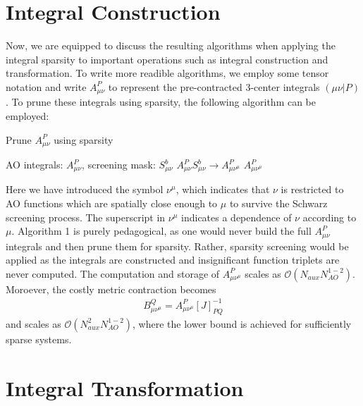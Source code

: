 \section{Integral Construction}

Now, we are equipped to discuss the resulting algorithms when applying the integral sparsity to important operations such as
integral construction and transformation. To write more readible algorithms, 
we employ some tensor notation and write $A_{\mu \nu}^P$ to represent
the pre-contracted 3-center integrals $(\mu \nu |P)$. To prune these integrals using sparsity, 
the following algorithm can be employed:

\begin{algorithm}
\caption{Prune $A_{\mu \nu}^P$ using sparsity}
\begin{algorithmic}
\REQUIRE AO integrals: $A_{\mu \nu}^P$, screening mask: $S_{\mu \nu}^b$
    \STATE $A_{\mu \nu}^P S_{\mu \nu}^b \rightarrow A_{\mu \nu^{\mu}}^P$
\ENDFOR
\RETURN $A_{\mu \nu^\mu}^P$
\end{algorithmic}
\end{algorithm}

\noindent Here we have introduced the symbol $\nu^\mu$, which indicates that $\nu$ is restricted to AO functions
which are spatially close enough to $\mu$ to survive the Schwarz screening process. The superscript in $\nu^\mu$ 
indicates a dependence of $\nu$ according to $\mu$. Algorithm 1 is purely pedagogical, as one would never
build the full $A_{\mu \nu}^P$ integrals and then prune them for sparsity. 
Rather, sparsity screening would be applied as the integrals are constructed and insignificant
function triplets are never computed. The computation
and storage of $A_{\mu \nu^\mu}^P$ scales as $\mathcal{O}(N_{aux}N_{AO}^{1-2})$. 
Moroever, the costly metric contraction becomes
\begin{align} 
B_{\mu \nu^\mu}^Q = A_{\mu \nu^\mu}^P[J]_{PQ}^{-1}
\end{align}
\noindent and scales as $\mathcal{O}(N_{aux}^2N_{AO}^{1-2})$, where the lower bound is achieved for sufficiently sparse
systems.

\section{Integral Transformation}

